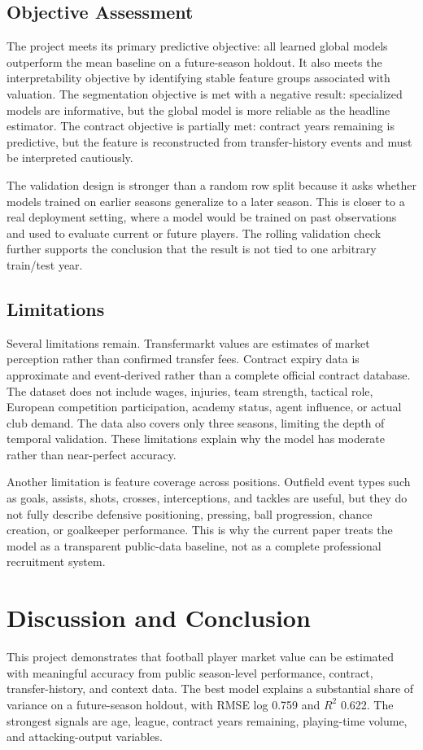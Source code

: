 \documentclass[conference]{IEEEtran}
\begin{document}
\subsection{Objective Assessment}
The project meets its primary predictive objective: all learned global models outperform the mean baseline on a future-season holdout. It also meets the interpretability objective by identifying stable feature groups associated with valuation. The segmentation objective is met with a negative result: specialized models are informative, but the global model is more reliable as the headline estimator. The contract objective is partially met: contract years remaining is predictive, but the feature is reconstructed from transfer-history events and must be interpreted cautiously.

The validation design is stronger than a random row split because it asks whether models trained on earlier seasons generalize to a later season. This is closer to a real deployment setting, where a model would be trained on past observations and used to evaluate current or future players. The rolling validation check further supports the conclusion that the result is not tied to one arbitrary train/test year.

\subsection{Limitations}
Several limitations remain. Transfermarkt values are estimates of market perception rather than confirmed transfer fees. Contract expiry data is approximate and event-derived rather than a complete official contract database. The dataset does not include wages, injuries, team strength, tactical role, European competition participation, academy status, agent influence, or actual club demand. The data also covers only three seasons, limiting the depth of temporal validation. These limitations explain why the model has moderate rather than near-perfect accuracy.

Another limitation is feature coverage across positions. Outfield event types such as goals, assists, shots, crosses, interceptions, and tackles are useful, but they do not fully describe defensive positioning, pressing, ball progression, chance creation, or goalkeeper performance. This is why the current paper treats the model as a transparent public-data baseline, not as a complete professional recruitment system.

\section{Discussion and Conclusion}
This project demonstrates that football player market value can be estimated with meaningful accuracy from public season-level performance, contract, transfer-history, and context data. The best model explains a substantial share of variance on a future-season holdout, with RMSE log 0.759 and \(R^2\) 0.622. The strongest signals are age, league, contract years remaining, playing-time volume, and attacking-output variables.
\end{document}
